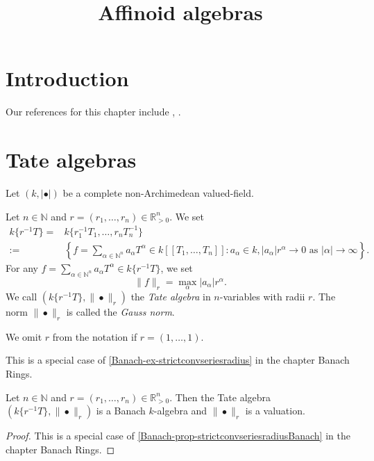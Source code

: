 
\title{Affinoid algebras}

\maketitle
\tableofcontents




\section{Introduction}\label{sec-introduction}
Our references  for this chapter include \cite{BGR}, \cite{Berk12}.
\section{Tate algebras}
Let $(k,|\bullet|)$ be a complete non-Archimedean valued-field. 

\begin{definition}
    Let $n\in \mathbb{N}$ and $r=(r_1,\ldots,r_n)\in \mathbb{R}^n_{>0}$. We set 
    \[
        \begin{split}
        k\{r^{-1}T\}=& k\{r_1^{-1}T_1,\ldots,r_n T_n^{-1}\} \\
        :=&\left\{f=\sum_{\alpha\in \mathbb{N}^n} a_{\alpha}T^{\alpha}\in k[[T_1,\ldots,T_n]]:a_{\alpha}\in k, |a_{\alpha}|r^{\alpha}\to 0\text{ as }|\alpha|\to\infty \right\}.
        \end{split}
    \]
    For any $f=\sum_{\alpha\in \mathbb{N}^n} a_{\alpha}T^{\alpha}\in k\{r^{-1}T\}$, we set
    \[
        \|f\|_r=\max_{\alpha}|a_{\alpha}|r^{\alpha}.  
    \]
    We call $(k\{r^{-1}T\},\|\bullet\|_r)$ the \emph{Tate algebra} in $n$-variables with radii $r$. The norm $\|\bullet\|_r$ is called the \emph{Gauss norm}.

    We omit $r$ from the notation if $r=(1,\ldots,1)$.
\end{definition}
This is a special case of \cref{Banach-ex-strictconvseriesradius}  in the chapter Banach Rings.
\begin{proposition}\label{prop-TateGaussvaluation}
    Let $n\in \mathbb{N}$ and $r=(r_1,\ldots,r_n)\in \mathbb{R}^n_{>0}$.  Then the Tate algebra $(k\{r^{-1}T\},\|\bullet\|_r)$ is a Banach $k$-algebra and $\|\bullet\|_r$ is a valuation.
\end{proposition}

\begin{proof}
    This is a special case of \cref{Banach-prop-strictconvseriesradiusBanach} in the chapter Banach Rings.
\end{proof}

